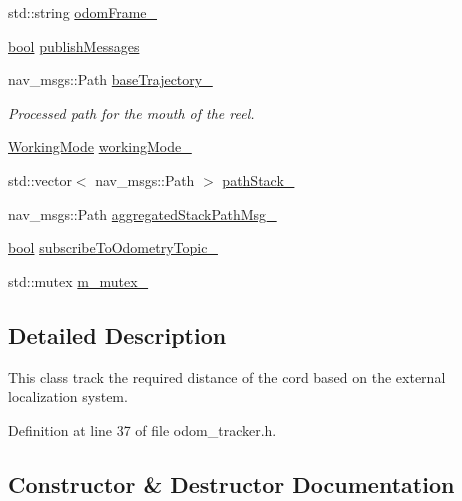 \begin{DoxyCompactItemize}
std\+::string \hyperlink{classcl__move__base__z_1_1odom__tracker_1_1OdomTracker_a54f31af5e74006560d94f266297853d4}{odom\+Frame\+\_\+}
\item 
\hyperlink{classbool}{bool} \hyperlink{classcl__move__base__z_1_1odom__tracker_1_1OdomTracker_a4f253d45ab5750dee3c2f18dd5599725}{publish\+Messages}
\item 
nav\+\_\+msgs\+::\+Path \hyperlink{classcl__move__base__z_1_1odom__tracker_1_1OdomTracker_a466d18a86df049f0f680e043bb5ea91f}{base\+Trajectory\+\_\+}
\begin{DoxyCompactList}\small\item\em Processed path for the mouth of the reel. \end{DoxyCompactList}\item 
\hyperlink{namespacecl__move__base__z_1_1odom__tracker_ac46b05813b2791604f6cd0a39ace3ef8}{Working\+Mode} \hyperlink{classcl__move__base__z_1_1odom__tracker_1_1OdomTracker_a5ae598c85c4469f4c0e984480575c42b}{working\+Mode\+\_\+}
\item 
std\+::vector$<$ nav\+\_\+msgs\+::\+Path $>$ \hyperlink{classcl__move__base__z_1_1odom__tracker_1_1OdomTracker_a1ccad1b568b6c65da43ba6639b6bd1ef}{path\+Stack\+\_\+}
\item 
nav\+\_\+msgs\+::\+Path \hyperlink{classcl__move__base__z_1_1odom__tracker_1_1OdomTracker_a0fb60113ace2791a1f1bbeed59946404}{aggregated\+Stack\+Path\+Msg\+\_\+}
\item 
\hyperlink{classbool}{bool} \hyperlink{classcl__move__base__z_1_1odom__tracker_1_1OdomTracker_afbe614b53a1493eb8268b8ea65b5b93a}{subscribe\+To\+Odometry\+Topic\+\_\+}
\item 
std\+::mutex \hyperlink{classcl__move__base__z_1_1odom__tracker_1_1OdomTracker_aa371639e1eee269273dec8d3ab9dba0f}{m\+\_\+mutex\+\_\+}
\end{DoxyCompactItemize}


\subsection{Detailed Description}
This class track the required distance of the cord based on the external localization system. 

Definition at line 37 of file odom\+\_\+tracker.\+h.



\subsection{Constructor \& Destructor Documentation}
\mbox{\label{classcl__move__base__z_1_1odom__tracker_1_1OdomTracker_a99e1f405d0b3ec3e9fc73e666793c409}} 

